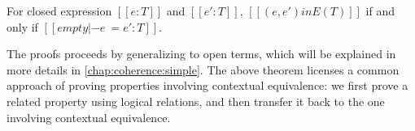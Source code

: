 \begin{theorem}
  For closed expression $[[e : T]]$ and $[[e' : T]]$, $[[ (e, e') in E(T)  ]]$ if and only if $[[  empty |- e ~= e' : T  ]]$.
\end{theorem}

The proofs proceeds by generalizing to open terms, which will be explained in
more details in \cref{chap:coherence:simple}. The above theorem licenses a
common approach of proving properties involving contextual equivalence: we first
prove a related property using logical relations, and then transfer it back to
the one involving contextual equivalence.




